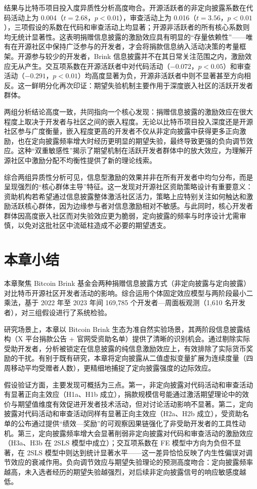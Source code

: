\documentclass[
    type = master, %
    degree = professional,        %
    decl-page,  %
    twoside,                %
    fontset = fandol %
  ]{njuthesis}
\begin{document}
结果与比特币项目投入度异质性分析高度吻合。开源活跃者的非定向披露系数在代码活动上为 0.004（$t = 2.68$，$p < 0.01$），审查活动上为 0.016（$t = 3.56$，$p < 0.01$），三项假设的系数在代码和审查活动上均显著；开源非活跃者的所有核心系数则均无统计显著性。这表明捐赠信息披露的激励效应具有明显的“存量依赖性”——唯有在开源社区中保持广泛参与的开发者，才会将捐款信息纳入活动决策的考量框架。开源参与较少的开发者，Brink 信息披露并不在其日常关注范围之内，激励效应无从产生。交互项系数在开源活跃者中对代码活动（$-0.072$，$p < 0.05$）和审查活动（$-0.291$，$p < 0.01$）均高度显著为负，开源非活跃者中则不显著甚至方向相反。这一鲜明分化再次印证：期望失验机制主要作用于深度嵌入社区的活跃开发者群体。

两组分析结论高度一致，共同指向一个核心发现：捐赠信息披露的激励效应在很大程度上取决于开发者与社区之间的嵌入程度。无论以比特币项目投入深度还是开源社区参与广度衡量，嵌入程度更高的开发者不仅从非定向披露中获得更多正向激励，也在定向披露频率增大时经历更明显的期望失验，最终导致更强的负向调节效应。这种“双重敏感性”揭示了期望机制在活跃开发者群体中的放大效应，为理解开源社区中激励分配不均衡性提供了新的理论线索。

综合两组异质性分析可见，信息型激励的效果并非在所有开发者中均匀分布，而是呈现强烈的“核心群体主导”特征。这一发现对开源社区资助策略设计有重要意义：资助机构若希望通过信息披露整体激活社区活力，策略上应特别关注如何触达和激励活跃核心群体，因为边缘参与者对信息激励相对不敏感。与此同时，核心开发者群体因高度嵌入社区而对失验效应更为脆弱，定向披露的频率与时序设计尤需审慎，以免对这批社区中流砥柱造成不必要的期望透支。

\section{本章小结}
\label{sec:summary-1}

本章聚焦 Bitcoin Brink 基金会两种捐赠信息披露方式（非定向披露与定向披露）对比特币开源社区开发者活动的影响。综合运用个体固定效应模型与两阶段最小二乘法，基于 2022 年至 2023 年间 169,785 个开发者—周面板观测（1,610 名开发者），对三组假设进行了系统检验。

研究场景上，本章以 Bitcoin Brink 生态为准自然实验场景，其两阶段信息披露结构（X 平台捐款公告 + 官网受资助名单）提供了清晰的识别机会。通过剔除实际受助开发者，分析被锁定在信息披露的纯信息激励效应上，有效排除了实际货币奖励的干扰。有别于既有研究，本章将定向披露从二值虚拟变量扩展为连续度量（四周移动平均受赠者人数），更精细地捕捉了定向披露强度的边际效应。

假设验证方面，主要发现可概括为三点。第一，非定向披露对代码活动和审查活动有显著正向主效应（H1a、H1b 成立），捐款规模信号能通过激活期望理论中的效价与期望值维度有效促进开发者技术活动，但对讨论活动影响不显著。第二，定向披露对代码活动和审查活动同样有显著正向主效应（H2a、H2b 成立），受资助名单的公布通过提供“绩效—奖励”的可观察因果链强化了非受助开发者的工具性动机。第三，定向披露频率增大会显著削弱非定向披露对代码和审查活动的激励效应（H3a、H3b 在 2SLS 模型中成立）；交互项系数在 FE 模型中方向为负但不显著，在 2SLS 模型中则达到统计显著水平——这一差异恰恰反映了内生性偏误对调节效应的衰减作用。负向调节效应与期望失验理论的预测高度吻合：定向披露频率越高，未入选者经历的期望失验越强烈，对后续非定向披露信号的响应敏感度越低。
\end{document}
